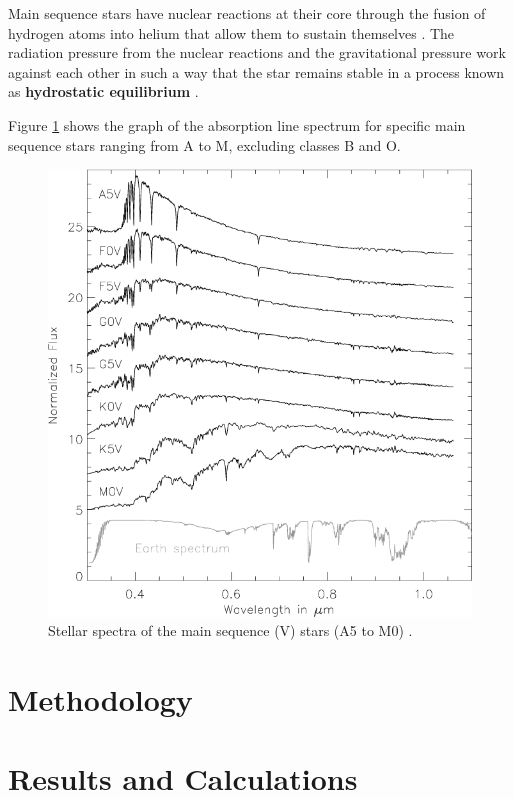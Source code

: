 \documentclass[12pt]{article}
\begin{document}
Main sequence stars have nuclear reactions at their core through the fusion of hydrogen atoms into helium that allow them to sustain themselves
\cite{schoolmsstar,studymsstar,nasamsstar}.
The radiation pressure from the nuclear reactions and the gravitational pressure work against each other in such a way that the star
remains stable \cite{studymsstar} in a process known as \textbf{hydrostatic equilibrium} \cite{schoolmsstar}.

Figure \ref{fig:msgraphspec} shows the graph of the absorption line spectrum for specific main sequence stars ranging from A to M, excluding classes B and O.

\begin{figure}[H]
    \centering
    \includegraphics[width=12.5cm]{msspectra.png}
    \caption{\centering Stellar spectra of the main sequence (V) stars (A5 to M0) \protect\cite{msspectrarticle}.}
    \label{fig:msgraphspec}
\end{figure}

\section{Methodology} \label{sec:2}



\section{Results and Calculations} \label{sec:3}
\end{document}
